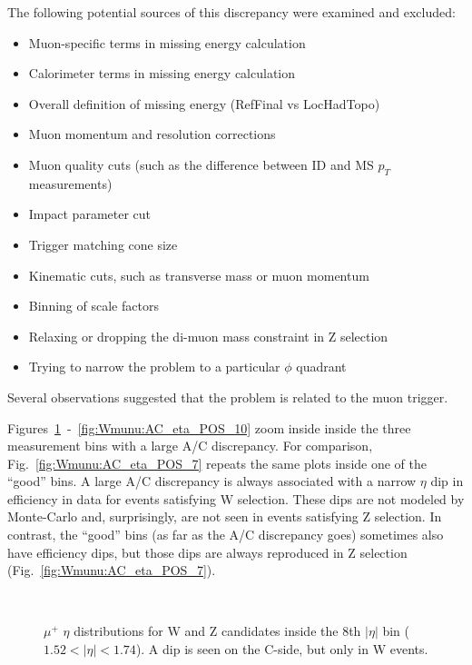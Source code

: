 The following potential sources of this discrepancy were examined and excluded:
\begin{itemize}
\item Muon-specific terms in missing energy calculation
\item Calorimeter terms in missing energy calculation
\item Overall definition of missing energy (RefFinal vs LocHadTopo)
\item Muon momentum and resolution corrections
\item Muon quality cuts (such as the difference between ID and MS $p_T$ measurements)
\item Impact parameter cut
\item Trigger matching cone size
\item Kinematic cuts, such as transverse mass or muon momentum
\item Binning of scale factors
\item Relaxing or dropping the di-muon mass constraint in Z selection
\item Trying to narrow the problem to a particular $\phi$ quadrant
\end{itemize}

Several observations suggested that the problem is related to the muon trigger.

Figures~\ref{fig:Wmunu:AC_eta_POS_8}~-~\ref{fig:Wmunu:AC_eta_POS_10} zoom inside inside the three measurement bins with a large A/C discrepancy. For comparison, Fig.~\ref{fig:Wmunu:AC_eta_POS_7} repeats the same plots inside one of the ``good'' bins. A large A/C discrepancy is always associated with a narrow $\eta$ dip in efficiency in data for events satisfying W selection. These dips are not modeled by Monte-Carlo and, surprisingly, are not seen in events satisfying Z selection. In contrast, the ``good'' bins (as far as the A/C discrepancy goes) sometimes also have efficiency dips, but those dips are always reproduced in Z selection (Fig.~\ref{fig:Wmunu:AC_eta_POS_7}).

\begin{figure}[phtb]
  \begin{center}
         \\
 \caption{ $\mu^+$ $\eta$ distributions for W and Z candidates inside the 8th $|\eta|$ bin ($1.52<|\eta|<1.74$). A dip is seen on the C-side, but only in W events.}
 \label{fig:Wmunu:AC_eta_POS_8}
 \end{center}
\end{figure}


